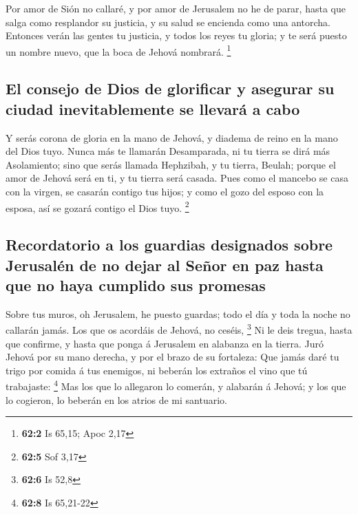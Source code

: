  Por amor de Sión no callaré, y por amor de Jerusalem no
he de parar, hasta que salga como resplandor su justicia, y su salud se
encienda como una antorcha.  Entonces verán las gentes tu
justicia, y todos los reyes tu gloria; y te será puesto un nombre nuevo,
que la boca de Jehová nombrará. \footnote{\textbf{62:2} Is 65,15; Apoc
  2,17}

\hypertarget{el-consejo-de-dios-de-glorificar-y-asegurar-su-ciudad-inevitablemente-se-llevaruxe1-a-cabo}{%
\subsection{El consejo de Dios de glorificar y asegurar su ciudad
inevitablemente se llevará a
cabo}\label{el-consejo-de-dios-de-glorificar-y-asegurar-su-ciudad-inevitablemente-se-llevaruxe1-a-cabo}}

 Y serás corona de gloria en la mano de Jehová, y diadema
de reino en la mano del Dios tuyo.  Nunca más te llamarán
Desamparada, ni tu tierra se dirá más Asolamiento; sino que serás
llamada Hephzibah, y tu tierra, Beulah; porque el amor de Jehová será en
ti, y tu tierra será casada.  Pues como el mancebo se casa
con la virgen, se casarán contigo tus hijos; y como el gozo del esposo
con la esposa, así se gozará contigo el Dios tuyo. \footnote{\textbf{62:5}
  Sof 3,17}

\hypertarget{recordatorio-a-los-guardias-designados-sobre-jerusaluxe9n-de-no-dejar-al-seuxf1or-en-paz-hasta-que-no-haya-cumplido-sus-promesas}{%
\subsection{Recordatorio a los guardias designados sobre Jerusalén de no
dejar al Señor en paz hasta que no haya cumplido sus
promesas}\label{recordatorio-a-los-guardias-designados-sobre-jerusaluxe9n-de-no-dejar-al-seuxf1or-en-paz-hasta-que-no-haya-cumplido-sus-promesas}}

 Sobre tus muros, oh Jerusalem, he puesto guardas; todo el
día y toda la noche no callarán jamás. Los que os acordáis de Jehová, no
ceséis, \footnote{\textbf{62:6} Is 52,8}  Ni le deis
tregua, hasta que confirme, y hasta que ponga á Jerusalem en alabanza en
la tierra.  Juró Jehová por su mano derecha, y por el
brazo de su fortaleza: Que jamás daré tu trigo por comida á tus
enemigos, ni beberán los extraños el vino que tú trabajaste: \footnote{\textbf{62:8}
  Is 65,21-22}  Mas los que lo allegaron lo comerán, y
alabarán á Jehová; y los que lo cogieron, lo beberán en los atrios de mi
santuario.

